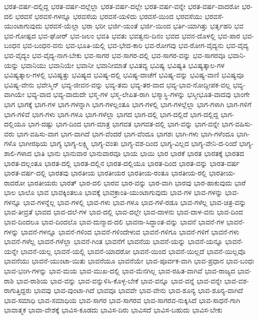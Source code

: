 {ಭರತ-ವರ್ಷ-ದಲ್ಲಿದ್ದ
ಭರತ-ವರ್ಷ-ದಲ್ಲೆಲ್ಲಾ
ಭರತ-ವರ್ಷ-ದಲ್ಲೇ
ಭರತ-ವರ್ಷ-ವನ್ನೇ
ಭರತ-ವರ್ಷ-ವಾದರೋ
ಭರ-ದಲಿ
ಭರವಸೆ
ಭರವಸೆ-ಗಳನ್ನೂ
ಭರವಸೆಯ
ಭರವಸೆ-ಯಳಿದು
ಭರವಸೆ-ಯಿಂದ
ಭರವಸೆಯು
ಭರವಸೆ-ಯುಂಟಾಗುವುದು
ಭರವಸೆ-ಯೆಲ್ಲಾ
ಭರಾ
ಭರೀ
ಭರ್ಜಿ-ಯಂತೆ
ಭರ್ಜಿ-ಯಿಂದ
ಭರ್ತಿ-ಯಾಗಿತ್ತು
ಭರ್ತೃಹರಿ
ಭವ
ಭವ-ಗೋಷ್ಪದ
ಭವ-ಘೋರ್
ಭವ-ಜಲಂ
ಭವತಿ
ಭವತು
ಭವತ್ವನು-ದಿನಂ
ಭವದ
ಭವನ-ದೊಳಲ್ಲಿ
ಭವ-ಪಾರ
ಭವ-ಬಂಧನ
ಭವ-ಬಂಧನ-ವನು
ಭವ-ಭೂತಿ-ಯಲ್ಲಿ
ಭವ-ಭೇದ-ಕಾರಿ
ಭವ-ರೋಗವು
ಭವ-ರೋಗ-ವೈದ್ಯನು
ಭವ-ವೈದ್ಯ
ಭವ-ವೈದ್ಯಂ
ಭವ-ವೈದ್ಯ-ನಾಗ-ಬೇಕು
ಭವ-ಸಾಗರ
ಭವ-ಸಾಗರ-ದಲ್ಲಿ
ಭವ-ಸಾಗರ-ವನ್ನು
ಭವ-ಸಾಗರವೂ
ಭವಾನಿ-ಯನ್ನು
ಭವಾನಿಯು
ಭವಾನಿಯೇ
ಭವಾನೀ
ಭವಾನೀಮಾತೆ
ಭವಿತವ್ಯ
ಭವಿಷ್ಯ
ಭವಿಷ್ಯತಿ
ಭವಿಷ್ಯತ್ಕಾಲ-ಗಳ
ಭವಿಷ್ಯತ್ಕಾಲ-ಗಳಲ್ಲಿ
ಭವಿಷ್ಯತ್ತು
ಭವಿಷ್ಯದ
ಭವಿಷ್ಯ-ದಲ್ಲಿ
ಭವಿಷ್ಯ-ದಾಚೆಗೆ
ಭವಿಷ್ಯ-ವನ್ನು
ಭವಿಷ್ಯ-ವಾಣಿ
ಭವಿಷ್ಯವೂ
ಭವಿಷ್ಯ-ವೇನು
ಭವೇಸ್ಮಿನ್
ಭವ್ಯ-ಜೀವನ-ವನ್ನು
ಭವ್ಯ-ತಮ
ಭವ್ಯ-ತರ-ವಾದ
ಭವ್ಯ-ಭಾವ-ನೋದ್ದೀಪಕ-ವಲ್ಲ
ಭವ್ಯ-ವಾಗಿಯೇ
ಭವ್ಯ-ವಾದ
ಭವ್ಯ-ವಾದುದೇ
ಭಸ್ಮ-ಗಳ
ಭಸ್ಮ-ಲೇಪಿತ-ರಾಗಿ
ಭಸ್ಮಾಸ್ಥಿ-ಗಳನ್ನು
ಭಸ್ಮೀಭೂತ-ವಾದವು
ಭಾಂಗೇ
ಭಾಗ
ಭಾಗಕ್ಕೆ
ಭಾಗ-ಗಳ
ಭಾಗ-ಗಳನ್ನಾಗಿ
ಭಾಗ-ಗಳಲ್ಲಂತೂ
ಭಾಗ-ಗಳಲ್ಲಿ
ಭಾಗ-ಗಳಲ್ಲೆಲ್ಲಾ
ಭಾಗ-ಗಳಾಗಿ
ಭಾಗ-ಗಳಿಗೆ
ಭಾಗ-ಗಳಿವೆ
ಭಾಗ-ಗಳು
ಭಾಗ-ಗಳೂ
ಭಾಗ-ಗಳೆಲ್ಲಾ
ಭಾಗದ
ಭಾಗ-ದಲ್ಲಿ
ಭಾಗ-ದಲ್ಲಿದೆ
ಭಾಗ-ದಲ್ಲಿದ್ದ
ಭಾಗ-ದಲ್ಲಿಯೂ
ಭಾಗ-ದಷ್ಟು
ಭಾಗ-ದಿಂದ
ಭಾಗ-ಮಾತ್ರ
ಭಾಗವತ
ಭಾಗವತ-ದಲ್ಲಿ
ಭಾಗ-ವನ್ನು
ಭಾಗ-ವನ್ನೇ
ಭಾಗ-ವಹಿಸು-ವರು
ಭಾಗ-ವಹಿಸು-ವಾಗ
ಭಾಗ-ವಾಗಿದೆ
ಭಾಗ-ವೆಂದರೆ
ಭಾಗ-ವೆಂದೂ
ಭಾಗಶಃ
ಭಾಗಿ-ಗಳು
ಭಾಗಿ-ಗಳೆಂದೂ
ಭಾಗಿ-ಗಳೊ
ಭಾಗೀರಥಿಯ
ಭಾಗ್ಯ
ಭಾಗ್ಯ-ಲಕ್ಷ್ಮಿ
ಭಾಗ್ಯ-ವಂತಃ
ಭಾಗ್ಯ-ವಶ-ದಿಂದ
ಭಾಗ್ಯ-ವಿಲ್ಲದ
ಭಾಗ್ಯ-ವೇನಿ-ದ-ರಿಂದೆ
ಭಾಗ್ಯ-ಶಾಲಿ-ಗಳಾದ
ಭಾತಿ
ಭಾನು
ಭಾನುವಾರ
ಭಾನುವಾರವೂ
ಭಾಯ
ಭಾಯಿ
ಭಾರ
ಭಾರಕೆ
ಭಾರತ
ಭಾರತಕ್ಕೆ
ಭಾರತದ
ಭಾರತ-ದಲ್ಲಂತೂ
ಭಾರತ-ದಲ್ಲಿ
ಭಾರತ-ದಲ್ಲಿನ
ಭಾರತ-ದಲ್ಲಿಯೂ
ಭಾರತ-ದಿಂದ
ಭಾರತ-ವನ್ನು
ಭಾರತ-ವರ್ಷ
ಭಾರತ-ವರ್ಷ-ದಲ್ಲಿ
ಭಾರತವು
ಭಾರತೀಯ
ಭಾರತೀಯರ
ಭಾರತೀಯ-ರಂತೂ
ಭಾರತೀಯ-ರಲ್ಲಿ
ಭಾರತೀಯ-ರಾದರೋ
ಭಾರತೀಯರು
ಭಾರತ್
ಭಾರ-ದಲಿ
ಭಾರವ
ಭಾರ-ವನ್ನು
ಭಾರ-ವಾಗಿ
ಭಾರವು
ಭಾರ-ಹಾಕುವುದು
ಭಾರೆ
ಭಾಲ
ಭಾಲೊ
ಭಾವ
ಭಾವಕ್ಕಿಂತಲೂ
ಭಾವಕ್ಕೆ
ಭಾವಕ್ರಾಂತಿ-ಯುಂಟಾಗುವುದು
ಭಾವ-ಗಳ
ಭಾವ-ಗಳನ್ನು
ಭಾವ-ಗಳನ್ನೂ
ಭಾವ-ಗಳನ್ನೆಲ್ಲ
ಭಾವ-ಗಳಲ್ಲಿ
ಭಾವ-ಗಳು
ಭಾವ-ಗಳೂ
ಭಾವ-ಗಳೆ-ರಡೂ
ಭಾವ-ಗಳೆಲ್ಲ
ಭಾವ-ಚಿತ್ರ-ವನ್ನು
ಭಾವ-ತೀವ್ರತೆ
ಭಾವದ
ಭಾವ-ದಲೆ-ಗಳ
ಭಾವ-ದಲ್ಲಿ
ಭಾವ-ದಲ್ಲೇ
ಭಾವ-ದಾಳನು
ಭಾವ-ದಾಳ-ವನು
ಭಾವ-ದಿಂದ
ಭಾವ-ದಿಂದಲೂ
ಭಾವ-ದಿಂದಲೊ
ಭಾವ-ದುನ್ಮಾದ-ದಲಿ
ಭಾವನಾ-ಸಿದ್ಧಾಂತ-ವನ್ನು
ಭಾವನೆ
ಭಾವನೆ-ಗಳ
ಭಾವನೆ-ಗಳನ್ನು
ಭಾವನೆ-ಗಳನ್ನೂ
ಭಾವನೆ-ಗಳಿಂದ
ಭಾವನೆ-ಗಳಿಂದೇಳುವ
ಭಾವನೆ-ಗಳಿಗೂ
ಭಾವನೆ-ಗಳಿಗೆ
ಭಾವನೆ-ಗಳು
ಭಾವನೆ-ಗಳೆಲ್ಲ
ಭಾವನೆ-ಗಳೆಲ್ಲಾ
ಭಾವನೆ-ಗಿಂತ
ಭಾವನೆಗೆ
ಭಾವನೆಯ
ಭಾವನೆ-ಯನ್ನು
ಭಾವನೆ-ಯನ್ನೂ
ಭಾವನೆ-ಯನ್ನೇ
ಭಾವನೆ-ಯಲ್ಲ
ಭಾವನೆ-ಯಲ್ಲಿ
ಭಾವನೆ-ಯಾದರೋ
ಭಾವನೆ-ಯಿಂದ
ಭಾವನೆ-ಯಿಲ್ಲದೆ
ಭಾವನೆ-ಯಿಲ್ಲವೊ
ಭಾವನೆಯು
ಭಾವನೆ-ಯುಂಟಾ-ಯಿತು
ಭಾವನೆಯೂ
ಭಾವನೆಯೇ
ಭಾವ-ಪೂರ್ವಕ-ವಾಗಿ
ಭಾವ-ಪ್ರಧಾನ
ಭಾವ-ಬಂಧಃ
ಭಾವ-ಭಂಗಿ-ಗಳನ್ನು
ಭಾವ-ಮಯ
ಭಾವ-ಮುಖ-ದಲ್ಲಿ
ಭಾವ-ಮೆನಗಿಲ್ಲ
ಭಾವ-ರಹಿತ-ವಾಗಿವೆ
ಭಾವ-ರಾಜ್ಯದ
ಭಾವ-ರಾಶಿ
ಭಾವ-ರಾಶಿಯ
ಭಾವ-ವನ್ನು
ಭಾವ-ವನ್ನುಳಿಸಿ-ಕೊಳ್ಳ-ಬೇಕೆ
ಭಾವ-ವನ್ನೂ
ಭಾವ-ವನ್ನೆ
ಭಾವ-ವನ್ನೇ
ಭಾವ-ವಶ-ರಾಗುತ್ತಿದ್ದರು
ಭಾವವು
ಭಾವ-ವುಂಟಾ-ಗಿದೆ
ಭಾವವೂ
ಭಾವವೇ
ಭಾವ-ವೇನು
ಭಾವ-ಶೂನ್ಯ
ಭಾವ-ಶೂನ್ಯ-ವಾಗಿದೆ
ಭಾವ-ಸಮಾಧಿ
ಭಾವ-ಸಮಾಧಿಯ
ಭಾವ-ಸಾಗರ
ಭಾವ-ಸಾಗರವ
ಭಾವ-ಸಾಗರವ-ನುಕ್ಕಿಸಿದೆ
ಭಾವ-ಸಾಧನೆ-ಗಾಗಿ
ಭಾವಾತ್ಮಕ
ಭಾವಾ-ವೇಶಕ್ಕೆ
ಭಾವಿಸ-ಕೂಡದು
ಭಾವಿಸ-ದಿರು
ಭಾವಿಸದೆ
ಭಾವಿಸ-ಬಹುದು
ಭಾವಿಸ-ಬೇಕು
}

